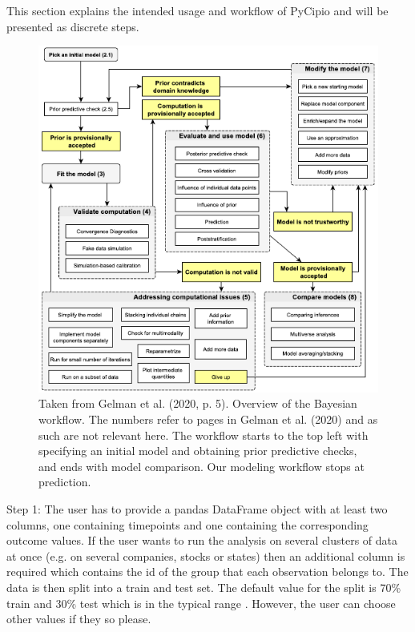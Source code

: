 \documentclass{article}
\begin{document}
\noindent This section explains the intended usage and workflow of PyCipio and will be presented as discrete steps. 

\begin{figure}[H]
    \centerline{\includegraphics[scale = 0.5]{images/Gelman.png}}
    \caption{Taken from Gelman et al. (2020, p. 5). Overview of the Bayesian workflow. The numbers refer to pages in Gelman et al. (2020) and as such are not relevant here. The workflow starts to the top left with specifying an initial model and obtaining prior predictive checks, and ends with model comparison. Our modeling workflow stops at prediction. }
\end{figure}

\noindent Step 1: The user has to provide a pandas DataFrame object with at least two columns, one containing timepoints and one containing the corresponding outcome values. If the user wants to run the analysis on several clusters of data at once (e.g. on several companies, stocks or states) then an additional column is required which contains the id of the group that each observation belongs to. The data is then split into a train and test set. The default value for the split is 70\% train and 30\% test which is in the typical range \cite{Brownlee}. However, the user can choose other values if they so please.
\end{document}
